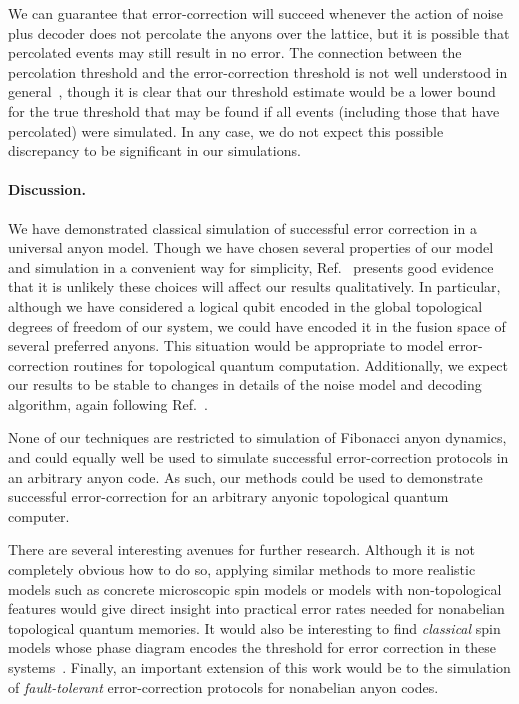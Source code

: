 \documentclass[aps, prl, letterpaper, twocolumn, superscriptaddress, notitlepage, 10pt]{revtex4-1}
\newcommand{\Aref}[1]{Appendix~\ref{#1}}
\begin{document}
We can guarantee that error-correction will succeed whenever
the action of noise plus decoder 
does not percolate the anyons over the lattice,
but it is possible that percolated events may still result in no error. 
The connection between the percolation threshold and the error-correction threshold 
is not well understood in general~\cite{Hastings2014}, though it is clear 
that our threshold estimate would be a lower bound for 
the true threshold that may be found if all events 
(including those that have percolated) were simulated. 
In any case, we do not expect this possible discrepancy to be significant in our simulations.


\paragraph{Discussion.}

We have demonstrated classical simulation of successful error correction in a universal anyon model. 
Though we have chosen several properties of our model and 
simulation in a convenient way for simplicity,
Ref.~\cite{Brell2013} presents good evidence that it is
unlikely these choices will affect our results qualitatively.
In particular, although we have considered a logical qubit encoded in the global topological degrees of freedom of our 
system, we could have encoded it in the fusion space of several preferred anyons. 
This situation would be appropriate to model error-correction routines for topological quantum computation. 
Additionally, we expect our results to be stable to changes in details of the noise model and decoding algorithm, again following Ref.~\cite{Brell2013}.

None of our techniques are restricted to simulation of Fibonacci anyon dynamics, and could 
equally well be used to simulate successful error-correction protocols in an arbitrary anyon code. 
As such, our methods could be used to demonstrate successful 
error-correction for an arbitrary anyonic topological quantum computer.

There are several interesting avenues for further research. 
Although it is not completely obvious how to do so, 
applying similar methods to more realistic models such as concrete 
microscopic spin models or models with non-topological features would give 
direct insight into practical error rates needed for nonabelian topological quantum memories.%
It would also be interesting to find \emph{classical} spin models 
whose phase diagram encodes the threshold for error correction in these systems~\cite{Dennis2002}.
Finally, an important extension of this work would be to the simulation of \emph{fault-tolerant} error-correction protocols for nonabelian anyon codes. 
\end{document}
